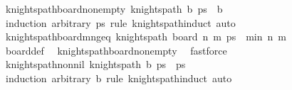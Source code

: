 \begin{isabellebody}
\isanewline
{}\isamarkupfalse%
%
\endisatagproof
{\isafoldproof}%
%
\isadelimproof
\isanewline
%
\endisadelimproof
\isanewline
{}\isamarkupfalse%
\ knights{\isacharunderscore}{\kern0pt}path{\isacharunderscore}{\kern0pt}board{\isacharunderscore}{\kern0pt}non{\isacharunderscore}{\kern0pt}empty{\isacharcolon}{\kern0pt}\ {\isachardoublequoteopen}knights{\isacharunderscore}{\kern0pt}path\ b\ ps\ {\isasymLongrightarrow}\ b\ {\isasymnoteq}\ {\isacharbraceleft}{\kern0pt}{\isacharbraceright}{\kern0pt}{\isachardoublequoteclose}\isanewline
%
\isadelimproof
\ \ %
\endisadelimproof
%
\isatagproof
{}\isamarkupfalse%
\ {\isacharparenleft}{\kern0pt}induction\ arbitrary{\isacharcolon}{\kern0pt}\ ps\ rule{\isacharcolon}{\kern0pt}\ knights{\isacharunderscore}{\kern0pt}path{\isachardot}{\kern0pt}induct{\isacharparenright}{\kern0pt}\ auto%
\endisatagproof
{\isafoldproof}%
%
\isadelimproof
\isanewline
%
\endisadelimproof
\isanewline
{}\isamarkupfalse%
\ knights{\isacharunderscore}{\kern0pt}path{\isacharunderscore}{\kern0pt}board{\isacharunderscore}{\kern0pt}m{\isacharunderscore}{\kern0pt}n{\isacharunderscore}{\kern0pt}geq{\isacharunderscore}{\kern0pt}{}{\isacharcolon}{\kern0pt}\ {\isachardoublequoteopen}knights{\isacharunderscore}{\kern0pt}path\ {\isacharparenleft}{\kern0pt}board\ n\ m{\isacharparenright}{\kern0pt}\ ps\ {\isasymLongrightarrow}\ min\ n\ m\ {\isasymge}\ {}{\isachardoublequoteclose}\isanewline
%
\isadelimproof
\ \ %
\endisadelimproof
%
\isatagproof
{}\isamarkupfalse%
\ board{\isacharunderscore}{\kern0pt}def\ \isamarkupfalse%
\ knights{\isacharunderscore}{\kern0pt}path{\isacharunderscore}{\kern0pt}board{\isacharunderscore}{\kern0pt}non{\isacharunderscore}{\kern0pt}empty\ \isamarkupfalse%
\ fastforce%
\endisatagproof
{\isafoldproof}%
%
\isadelimproof
\isanewline
%
\endisadelimproof
\isanewline
{}\isamarkupfalse%
\ knights{\isacharunderscore}{\kern0pt}path{\isacharunderscore}{\kern0pt}non{\isacharunderscore}{\kern0pt}nil{\isacharcolon}{\kern0pt}\ {\isachardoublequoteopen}knights{\isacharunderscore}{\kern0pt}path\ b\ ps\ {\isasymLongrightarrow}\ ps\ {\isasymnoteq}\ {\isacharbrackleft}{\kern0pt}{\isacharbrackright}{\kern0pt}{\isachardoublequoteclose}\isanewline
%
\isadelimproof
\ \ %
\endisadelimproof
%
\isatagproof
{}\isamarkupfalse%
\ {\isacharparenleft}{\kern0pt}induction\ arbitrary{\isacharcolon}{\kern0pt}\ b\ rule{\isacharcolon}{\kern0pt}\ knights{\isacharunderscore}{\kern0pt}path{\isachardot}{\kern0pt}induct{\isacharparenright}{\kern0pt}\ auto%

\end{isabellebody}
